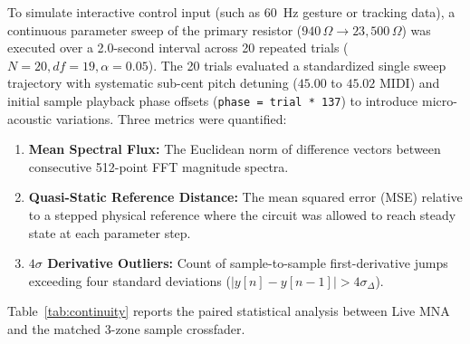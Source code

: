 \documentclass[fleqn,final]{jaes}
\begin{document}
To simulate interactive control input (such as 60~Hz gesture or tracking data), a continuous parameter sweep of the primary resistor ($940\,\Omega \to 23,500\,\Omega$) was executed over a 2.0-second interval across 20 repeated trials ($N = 20, df = 19, \alpha = 0.05$). The 20 trials evaluated a standardized single sweep trajectory with systematic sub-cent pitch detuning ($45.00$ to $45.02$ MIDI) and initial sample playback phase offsets (\texttt{phase = trial * 137}) to introduce micro-acoustic variations. Three metrics were quantified:
\begin{enumerate}
\item \textbf{Mean Spectral Flux:} The Euclidean norm of difference vectors between consecutive 512-point FFT magnitude spectra.
\item \textbf{Quasi-Static Reference Distance:} The mean squared error (MSE) relative to a stepped physical reference where the circuit was allowed to reach steady state at each parameter step.
\item \textbf{$4\sigma$ Derivative Outliers:} Count of sample-to-sample first-derivative jumps exceeding four standard deviations ($|y[n] - y[n-1]| > 4\sigma_{\Delta}$).
\end{enumerate}

Table~\ref{tab:continuity} reports the paired statistical analysis between Live MNA and the matched 3-zone sample crossfader.

\begin{table}[t]
\caption{Paired Statistical Analysis: Live MNA vs. 3-Zone Sample Crossfade under 60~Hz Modulation ($N=20$ Trials, $df=19$).}
\label{tab:continuity}
\centering
{}
\end{table}
\end{document}
